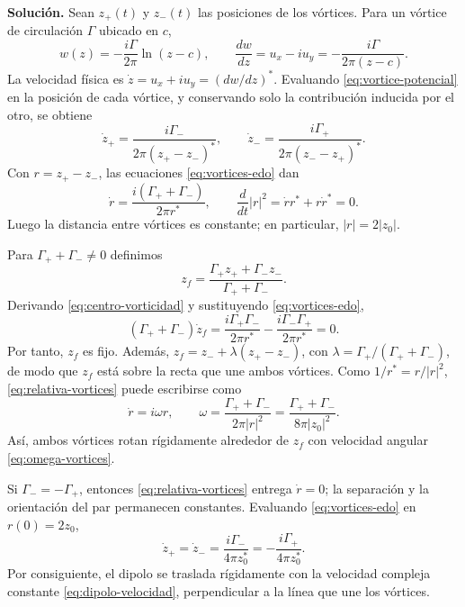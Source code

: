 \documentclass[11pt]{article}
\begin{document}
\noindent\textbf{Solución.}
Sean $z_+(t)$ y $z_-(t)$ las posiciones de los vórtices. Para un vórtice de circulación $\Gamma$ ubicado en $c$,
\begin{equation}
w(z)=-\frac{i\Gamma}{2\pi}\ln(z-c),
\qquad
\frac{dw}{dz}=u_x-iu_y=-\frac{i\Gamma}{2\pi(z-c)}.
\label{eq:vortice-potencial}
\end{equation}
La velocidad física es $\dot z=u_x+iu_y=(dw/dz)^*$. Evaluando \eqref{eq:vortice-potencial} en la posición de cada vórtice, y conservando solo la contribución inducida por el otro, se obtiene
\begin{equation}
\dot z_+=\frac{i\Gamma_-}{2\pi (z_+-z_-)^*},
\qquad
\dot z_- =\frac{i\Gamma_+}{2\pi (z_--z_+)^*}.
\label{eq:vortices-edo}
\end{equation}
Con $r=z_+-z_-$, las ecuaciones \eqref{eq:vortices-edo} dan
\begin{equation}
\dot r=\frac{i(\Gamma_++\Gamma_-)}{2\pi r^*},
\qquad
\frac{d}{dt}|r|^2=\dot r r^*+r\dot r^*=0.
\label{eq:relativa-vortices}
\end{equation}
Luego la distancia entre vórtices es constante; en particular, $|r|=2|z_0|$.

Para $\Gamma_++\Gamma_-\ne0$ definimos
\begin{equation}
z_f=\frac{\Gamma_+z_+ +\Gamma_-z_-}{\Gamma_++\Gamma_-}.
\label{eq:centro-vorticidad}
\end{equation}
Derivando \eqref{eq:centro-vorticidad} y sustituyendo \eqref{eq:vortices-edo},
\begin{equation}
(\Gamma_++\Gamma_-)\dot z_f=
\frac{i\Gamma_+\Gamma_-}{2\pi r^*}-\frac{i\Gamma_-\Gamma_+}{2\pi r^*}=0.
\label{eq:zf-fijo}
\end{equation}
Por tanto, $z_f$ es fijo. Además, $z_f=z_-+\lambda(z_+-z_-)$, con $\lambda=\Gamma_+/(\Gamma_++\Gamma_-)$, de modo que $z_f$ está sobre la recta que une ambos vórtices. Como $1/r^*=r/|r|^2$, \eqref{eq:relativa-vortices} puede escribirse como
\begin{equation}
\dot r=i\omega r,
\qquad
\omega=\frac{\Gamma_++\Gamma_-}{2\pi |r|^2}
       =\frac{\Gamma_++\Gamma_-}{8\pi |z_0|^2}.
\label{eq:omega-vortices}
\end{equation}
Así, ambos vórtices rotan rígidamente alrededor de $z_f$ con velocidad angular \eqref{eq:omega-vortices}.

Si $\Gamma_-=-\Gamma_+$, entonces \eqref{eq:relativa-vortices} entrega $\dot r=0$; la separación y la orientación del par permanecen constantes. Evaluando \eqref{eq:vortices-edo} en $r(0)=2z_0$,
\begin{equation}
\dot z_+=\dot z_-=\frac{i\Gamma_-}{4\pi z_0^*}
             =-\frac{i\Gamma_+}{4\pi z_0^*}.
\label{eq:dipolo-velocidad}
\end{equation}
Por consiguiente, el dipolo se traslada rígidamente con la velocidad compleja constante \eqref{eq:dipolo-velocidad}, perpendicular a la línea que une los vórtices.
\end{document}
